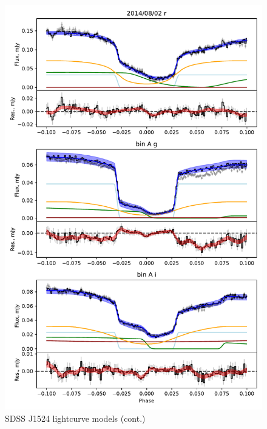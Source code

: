 \begin{figure}
    \centering
    \includegraphics[width=\textwidth]{figures/results/SDSS1524/SDSS1524_2.pdf}
    \caption{SDSS J1524 lightcurve models (cont.)}
    \label{fig:SDSS1524 all lightcurves cont 1}
\end{figure}
